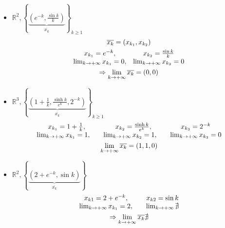 \begin{exbar}

\begin{itemize}
	\item $\mathbb{R}^2, \left\{ \underbrace{ \left(e^{-k}, \frac{\sin k}{k} \right)} _ {\overline{x_k}} \right\}_{k \geq 1}$
	\begin{gather*}
		\overline{x_k} = (x_{k_1}, x_{k_2})
		\\
		\begin{array}{c c}
			x_{k_1} = e^{-k}, &
			x_{k_2} = \frac{\sin k}{k}
			\\
			\lim_{k \rightarrow +\infty} x_{k_1}=0, & \lim_{k \rightarrow +\infty} x_{k_2} = 0
		\end{array}
		\\
		\Rightarrow \lim_{k \rightarrow + \infty} \overline{x_k} = (0,0)
	\end{gather*}
	
	\item $\mathbb{R}^3, \left\{ \underbrace{ \left(1 + \frac{1}{k}, \frac{\sinh k}{e^k}, 2^{-k} \right)} _ {\overline{x_k}} \right\}_{k \geq 1}$
	\begin{gather*}
		\begin{array}{c c c}
		x_{k_1} = 1 + \frac{1}{k}, 
		& x_{k_2} = \frac{\sinh k}{e^k}, 
		& x_{k_3} = 2^{-k}
		\\
		\lim_{k \rightarrow +\infty} x_{k_1} = 1, \quad
		& \lim_{k \rightarrow +\infty} x_{k_2} = 1, \quad 
		& \lim_{k \rightarrow +\infty} x_{k_3} = 0 
	\end{array}
		\\
		\lim_{k \rightarrow +\infty} \overline{x_k} = (1, 1, 0)
	\end{gather*}

	\item $\mathbb{R}^2, \left\{ \underbrace{(2+e^{-k}, \sin k)} _ {\overline{x_k}} \right\} $
	\begin{gather*}
	\begin{array}{c c}
		x_{k1} = 2+e^{-k}, \quad 
		& x_{k2} = \sin k
		\\
		\lim_{k \rightarrow +\infty} x_{k_1} = 2, \quad 
		& \lim_{k \rightarrow +\infty} \nexists
	\end{array}
		\\
		\Rightarrow \lim_{k \rightarrow +\infty} \overline{x_k} \nexists
	\end{gather*}

\end{itemize}
\end{exbar}


